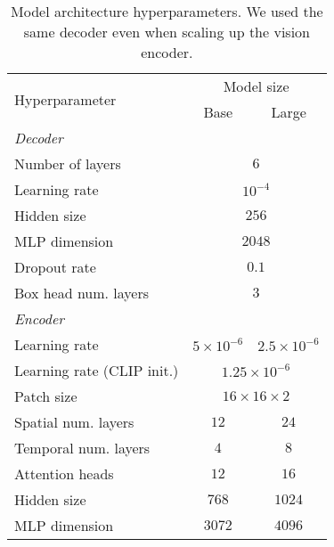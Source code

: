 \documentclass[10pt,twocolumn,letterpaper]{article}
\begin{document}
\begin{table}[t]
\centering
\caption{Model architecture hyperparameters. 
We used the same decoder even when scaling up the vision encoder.
}
\begin{tabular}{lcc}
\toprule
\multirow{2}{*}{Hyperparameter} & \multicolumn{2}{c}{Model size} \\
\cmidrule(l){2-3}
               & Base         & Large         \\
\midrule

\textit{Decoder} \\
Number of layers &  \multicolumn{2}{c}{$6$} \\
Learning rate & \multicolumn{2}{c}{$10^{-4}$}  \\
Hidden size & \multicolumn{2}{c}{$256$} \\
MLP dimension & \multicolumn{2}{c}{$2048$} \\
Dropout rate & \multicolumn{2}{c}{$0.1$} \\
Box head num. layers & \multicolumn{2}{c}{$3$} \vspace{0.5ex} \\

\textit{Encoder} \\
Learning rate & $5\times10^{-6}$ & $2.5\times10^{-6}$ \\
Learning rate (CLIP init.) & \multicolumn{2}{c}{$1.25\times10^{-6}$} \\
Patch size &\multicolumn{2}{c}{$16\times16\times2$} \\
Spatial num. layers & $12$ & $24$ \\
Temporal num. layers & $4$ & $8$ \\
Attention heads & $12$ & $16$ \\
Hidden size & $768$ & $1024$ \\
MLP dimension & $3072$ & $4096$ \\
\bottomrule
\end{tabular}
\label{tab:architecture-details}
\end{table}
\end{document}
